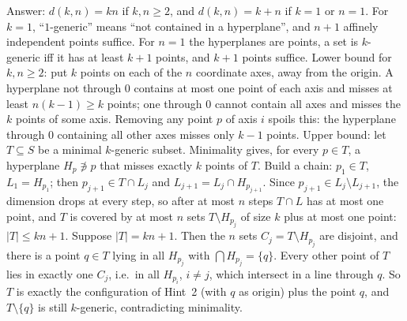 \documentclass[11pt,a4paper]{article}
\begin{document}
 Answer: $d(k,n)=kn$ if $k,n\ge2$, and $d(k,n)=k+n$ if $k=1$ or $n=1$. For $k=1$, ``$1$-generic'' means ``not contained in a hyperplane'', and $n+1$ affinely independent points suffice. For $n=1$ the hyperplanes are points, a set is $k$-generic iff it has at least $k+1$ points, and $k+1$ points suffice.
 Lower bound for $k,n\ge2$: put $k$ points on each of the $n$ coordinate axes, away from the origin. A hyperplane not through $0$ contains at most one point of each axis and misses at least $n(k-1)\ge k$ points; one through $0$ cannot contain all axes and misses the $k$ points of some axis. Removing any point $p$ of axis $i$ spoils this: the hyperplane through $0$ containing all other axes misses only $k-1$ points.
 Upper bound: let $T\subseteq S$ be a minimal $k$-generic subset. Minimality gives, for every $p\in T$, a hyperplane $H_p\not\ni p$ that misses exactly $k$ points of $T$. Build a chain: $p_1\in T$, $L_1=H_{p_1}$; then $p_{j+1}\in T\cap L_j$ and $L_{j+1}=L_j\cap H_{p_{j+1}}$. Since $p_{j+1}\in L_j\setminus L_{j+1}$, the dimension drops at every step, so after at most $n$ steps $T\cap L$ has at most one point, and $T$ is covered by at most $n$ sets $T\setminus H_{p_j}$ of size $k$ plus at most one point: $|T|\le kn+1$.
 Suppose $|T|=kn+1$. Then the $n$ sets $C_j=T\setminus H_{p_j}$ are disjoint, and there is a point $q\in T$ lying in all $H_{p_j}$ with $\bigcap H_{p_j}=\{q\}$. Every other point of $T$ lies in exactly one $C_j$, i.e.\ in all $H_{p_i}$, $i\ne j$, which intersect in a line through $q$. So $T$ is exactly the configuration of Hint~2 (with $q$ as origin) plus the point $q$, and $T\setminus\{q\}$ is still $k$-generic, contradicting minimality.
\end{document}
